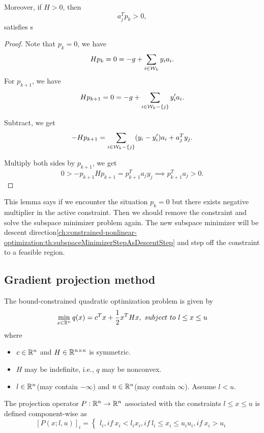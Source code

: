 \begin{refsection}
\begin{lemma}
	Moreover, if $H > 0$, then $$a_j^T p_{k} > 0,$$ satisfies s
\end{lemma}
\begin{proof}
	Note that $p_k = 0$, we have
	$$Hp_{k} = 0 = -g + \sum_{i\in\mathcal{W}_k} y_i a_i.$$
	For $p_{k+1}$, we have
	$$Hp_{k+1} = 0 = -g + \sum_{i\in\mathcal{W}_k -\{j\}} y_i' a_i.$$
	
	Subtract, we get
	$$-Hp_{k+1} = \sum_{i\in\mathcal{W}_k -\{j\}} (y_i - y_i') a_i + a_j^Ty_j.$$
	
	Multiply both sides by $p_{k+1}$, we get
	$$0 > -p_{k+1}Hp_{k+1} = p_{k+1}^Ta_jy_j \implies p_{k+1}^Ta_j > 0.$$
\end{proof}

\begin{remark}
This lemma says if we encounter the situation $p_k = 0$ but there exists negative multiplier in the active constraint. Then we should remove the constraint and solve the subspace minimizer problem again. The new subspace minimizer will be descent direction\autoref{ch:constrained-nonlinear-optimization:th:subspaceMinimizerStepAsDescentStep} and step off the constraint to a feasible region. 
\end{remark}



\subsection{Gradient projection method}
\begin{definition}\label{ch:constrained-nonlinear-optimization:def:bound-constrained quadratic optimization}
The bound-constrained quadratic optimization problem is given by
$$\min_{x\in \mathbb{R}^n } q(x) = c^Tx + \frac{1}{2}x^THx, ~subject~to~  l \leq x \leq u$$
where
\begin{itemize}
	\item $c\in \mathbb{R}^n$ and $H\in \mathbb{R}^{n\times n}$ is symmetric.
	\item $H$ may be indefinite, i.e., $q$ may be nonconvex.
	\item $l\in \mathbb{R}^n$(may contain $-\infty$) and $u\in \mathbb{R}^n$(may contain $\infty$). Assume $l < u$.
\end{itemize}
\end{definition}

\begin{definition}
The projection operator $P:\mathbb{R}^n\to \mathbb{R}^n$ associated with the constraints $l\leq x \leq u$ is defined component-wise as
$$[P(x;l,u)]_i = \begin{cases}
l_i, if~ x_i < l_i
x_i, if~ l_i \leq x_i \leq u_i
u_i, if~ x_i > u_i
\end{cases}$$
\end{definition}


\end{refsection}
